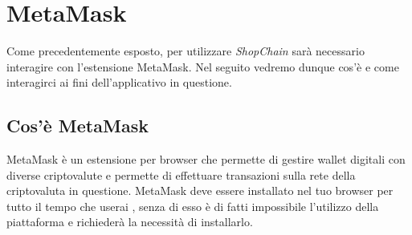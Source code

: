 \section{MetaMask}\label{section:MetaMask}
Come precedentemente esposto, per utilizzare \textit{ShopChain} sarà necessario interagire con l'estensione MetaMask. Nel seguito vedremo dunque cos'è e come interagirci ai fini dell'applicativo in questione.
\subsection{Cos'è MetaMask}
MetaMask è un estensione per browser che permette di gestire wallet\glo{} digitali con diverse criptovalute\glo{} e permette di effettuare transazioni sulla rete della criptovaluta in questione.
MetaMask deve essere installato nel tuo browser per tutto il tempo che userai \projectName{}, senza di esso è di fatti impossibile l'utilizzo della piattaforma e richiederà la necessità di installarlo.
